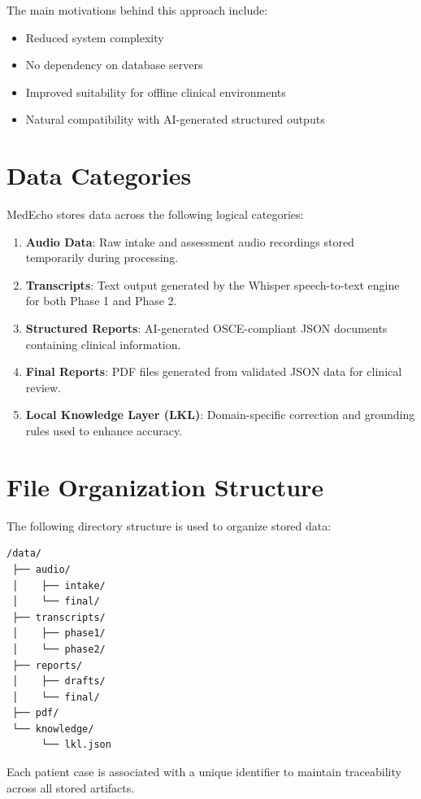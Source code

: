 \documentclass[12pt,a4paper]{report}
\begin{document}
The main motivations behind this approach include:
\begin{itemize}
    \item Reduced system complexity
    \item No dependency on database servers
    \item Improved suitability for offline clinical environments
    \item Natural compatibility with AI-generated structured outputs
\end{itemize}

\section{Data Categories}
MedEcho stores data across the following logical categories:

\begin{enumerate}
    \item \textbf{Audio Data}: Raw intake and assessment audio recordings stored temporarily during processing.
    \item \textbf{Transcripts}: Text output generated by the Whisper speech-to-text engine for both Phase 1 and Phase 2.
    \item \textbf{Structured Reports}: AI-generated OSCE-compliant JSON documents containing clinical information.
    \item \textbf{Final Reports}: PDF files generated from validated JSON data for clinical review.
    \item \textbf{Local Knowledge Layer (LKL)}: Domain-specific correction and grounding rules used to enhance accuracy.
\end{enumerate}

\section{File Organization Structure}
The following directory structure is used to organize stored data:

\begin{verbatim}
/data/
 ├── audio/
 │    ├── intake/
 │    └── final/
 ├── transcripts/
 │    ├── phase1/
 │    └── phase2/
 ├── reports/
 │    ├── drafts/
 │    └── final/
 ├── pdf/
 └── knowledge/
      └── lkl.json
\end{verbatim}

Each patient case is associated with a unique identifier to maintain traceability across all stored artifacts.
\end{document}
